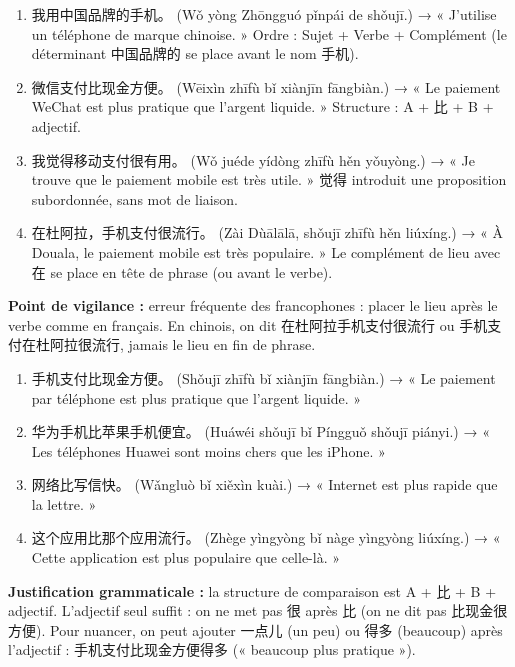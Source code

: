 \documentclass[11pt]{article}
\newcommand{\cle}[1]{{\popxbold\color{popdark}#1}}
\begin{document}
\begin{corrige}
\begin{enumerate}
\item 我用中国品牌的手机。 (Wǒ yòng Zhōngguó pǐnpái de shǒujī.) → « J'utilise un téléphone de marque chinoise. » Ordre : Sujet + Verbe + Complément (le déterminant 中国品牌的 se place avant le nom 手机).
\item 微信支付比现金方便。 (Wēixìn zhīfù bǐ xiànjīn fāngbiàn.) → « Le paiement WeChat est plus pratique que l'argent liquide. » Structure : A + 比 + B + adjectif.
\item 我觉得移动支付很有用。 (Wǒ juéde yídòng zhīfù hěn yǒuyòng.) → « Je trouve que le paiement mobile est très utile. » 觉得 introduit une proposition subordonnée, sans mot de liaison.
\item 在杜阿拉，手机支付很流行。 (Zài Dùālālā, shǒujī zhīfù hěn liúxíng.) → « À Douala, le paiement mobile est très populaire. » Le complément de lieu avec 在 se place en tête de phrase (ou avant le verbe).
\end{enumerate}
\textbf{Point de vigilance :} erreur fréquente des francophones : placer le lieu après le verbe comme en français. En chinois, on dit 在杜阿拉手机支付很流行 ou 手机支付在杜阿拉很流行, jamais le lieu en fin de phrase.
\end{corrige}

\begin{corrige}
\begin{enumerate}
\item 手机支付比现金方便。 (Shǒujī zhīfù bǐ xiànjīn fāngbiàn.) → « Le paiement par téléphone est plus pratique que l'argent liquide. »
\item 华为手机比苹果手机便宜。 (Huáwéi shǒujī bǐ Píngguǒ shǒujī piányi.) → « Les téléphones Huawei sont moins chers que les iPhone. »
\item 网络比写信快。 (Wǎngluò bǐ xiěxìn kuài.) → « Internet est plus rapide que la lettre. »
\item 这个应用比那个应用流行。 (Zhège yìngyòng bǐ nàge yìngyòng liúxíng.) → « Cette application est plus populaire que celle-là. »
\end{enumerate}
\textbf{Justification grammaticale :} la structure de comparaison est \cle{A + 比 + B + adjectif}. L'adjectif seul suffit : on ne met pas 很 après 比 (on ne dit pas 比现金很方便). Pour nuancer, on peut ajouter 一点儿 (un peu) ou 得多 (beaucoup) après l'adjectif : 手机支付比现金方便得多 (« beaucoup plus pratique »).
\end{corrige}
\end{document}
